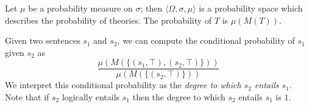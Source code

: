 \documentclass{svmult}
\begin{document}
Let $\mu$ be a probability measure on $\sigma$; then
$\langle\Omega,\sigma,\mu\rangle$ is a probability space which
describes the probability of theories. The probability of $T$ is
$\mu(M(T))$.


Given two sentences $s_1$ and $s_2$, we can compute the conditional
probability of $s_1$ given $s_2$ as
$$\frac{\mu(M(\{(s_1, \top), (s_2, \top)\}))}{\mu(M(\{(s_2,\top)\}))}$$
We interpret this conditional probability as the {\em degree to which $s_2$ entails $s_1$\/}. Note that if $s_2$ logically entails $s_1$ then the degree to which  $s_2$ entails $s_1$ is $1$.




 
\end{document}
